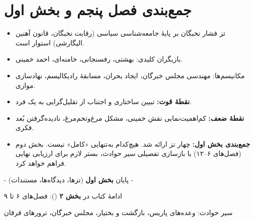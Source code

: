 \documentclass[12pt,a4paper]{book}
\newcommand{\keyword}[1]{\textbf{\textcolor{cPrimary}{#1}}}
\newcommand{\en}[1]{\lr{\textit{#1}}}
\begin{document}
\section{جمع‌بندی فصل پنجم و بخش اول}

\begin{principleBox}
\begin{itemize}[label=\textcolor{cPrimary}{$\blacksquare$}, rightmargin=2em]
    \item تز فشار نخبگان بر پایهٔ جامعه‌شناسی سیاسی (رقابت نخبگان، قانون آهنین الیگارشی) استوار است.
    \item بازیگران کلیدی: بهشتی، رفسنجانی، خامنه‌ای، احمد خمینی.
    \item مکانیسم‌ها: مهندسی مجلس خبرگان، ایجاد بحران، مسابقهٔ رادیکالیسم، نهادسازی موازی.
    \item \keyword{نقطهٔ قوت:} تبیین ساختاری و اجتناب از تقلیل‌گرایی به یک فرد.
    \item \keyword{نقطهٔ ضعف:} کم‌اهمیت‌نمایی نقش خمینی، مشکل مرغ‌وتخم‌مرغ، نادیده‌گرفتن بُعد فکری.
    \item \keyword{جمع‌بندی بخش اول:} چهار تز ارائه شد. هیچ‌کدام به‌تنهایی «کامل» نیست. بخش دوم (فصل‌های ۶–۱۲) با بازسازی تفصیلی سیر حوادث، بستر لازم برای ارزیابی نهایی فراهم خواهد کرد.
\end{itemize}
\end{principleBox}

\vspace{1cm}

\begin{center}

\vspace{0.5cm}
{\small\color{cGray} - پایان \textbf{بخش اول} (تزها، دیدگاه‌ها، مستندات) -}

\vspace{0.3cm}
{\small\color{cGray} ادامهٔ کتاب در \textbf{بخش ۲} (\en{Segment 2}): فصل‌های ۶ تا ۹}

\vspace{0.2cm}
{\small\color{cGray} سیر حوادث: وعده‌های پاریس، بازگشت و بختیار، مجلس خبرگان، ترورهای فرقان}
\end{center}


\end{document}

